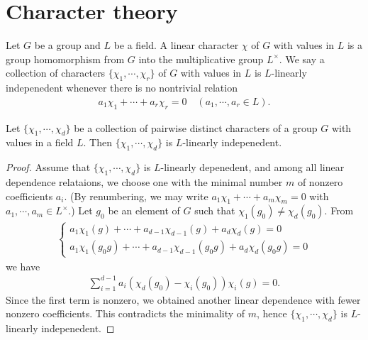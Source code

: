 \section{Character theory}

\begin{defi}
    Let $G$ be a group and $L$ be a field.
    A linear character $\chi$ of $G$ with values in $L$ is a group homomorphism from $G$ into the multiplicative group $L^\times$.
    We say a collection of characters $\{\chi_1, \cdots, \chi_r\}$ of $G$ with values in $L$ is $L$-linearly indepenedent whenever there is no nontrivial relation
    \begin{align*}
        a_1\chi_1+\cdots+a_r\chi_r=0\quad(a_1, \cdots, a_r\in L).
    \end{align*}
\end{defi}

\begin{prop}\label{linear_independence_of_charaaters}
    Let $\{\chi_1, \cdots, \chi_d\}$ be a collection of pairwise distinct characters of a group $G$ with values in a field $L$.
    Then $\{\chi_1, \cdots, \chi_d\}$ is $L$-linearly indepenedent.
\end{prop}
\begin{proof}
    Assume that $\{\chi_1, \cdots, \chi_d\}$ is $L$-linearly depenedent, and among all linear dependence relataions, we choose one with the minimal number $m$ of nonzero coefficients $a_i$.
    (By renumbering, we may write $a_1\chi_1+\cdots+a_m\chi_m=0$ with $a_1, \cdots, a_m\in L^\times$.)
    Let $g_0$ be an element of $G$ such that $\chi_1(g_0)\neq\chi_d(g_0)$.
    From
    \begin{align*}
        \left\{\begin{array}{c}
            a_1\chi_1(g)+\cdots+a_{d-1}\chi_{d-1}(g)+a_d\chi_d(g)=0\\
            a_1\chi_1(g_0 g)+\cdots+a_{d-1}\chi_{d-1}(g_0 g)+a_d\chi_d(g_0 g)=0
        \end{array}\right.
    \end{align*}
    we have
    \begin{align*}
        \sum_{i=1}^{d-1} a_i(\chi_d(g_0)-\chi_i(g_0))\chi_i(g)=0.
    \end{align*}
    Since the first term is nonzero, we obtained another linear dependence with fewer nonzero coefficients.
    This contradicts the minimality of $m$, hence $\{\chi_1, \cdots, \chi_d\}$ is $L$-linearly indepenedent.
\end{proof}